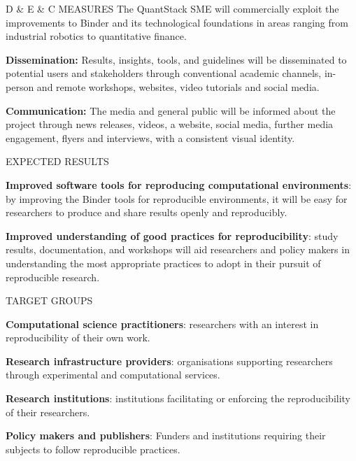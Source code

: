 \begin{multicols}{2}
\begin{summarybox}{D \& E \& C MEASURES}
The QuantStack SME will commercially exploit the improvements to Binder and its technological foundations in areas ranging from
industrial robotics to quantitative finance.

\textbf{Dissemination:} Results, insights, tools, and guidelines will
  be disseminated to potential users and stakeholders through conventional
  academic channels, in-person and remote workshops, websites, video tutorials
  and social media.

\textbf{Communication:} The media and general public will be informed
  about the project through news releases, videos, a website, social media,
  further media engagement, flyers and interviews, with a consistent visual
  identity.
\end{summarybox}

\begin{summarybox}{EXPECTED RESULTS}

\textbf{Improved software tools for reproducing computational environments}:
by improving the Binder tools for reproducible environments,
it will be easy for researchers to produce and share results openly and reproducibly.

\textbf{Improved understanding of good practices for reproducibility}: study results, documentation, and workshops will aid researchers and policy makers in understanding the most appropriate practices to adopt in their pursuit of reproducible research.

\end{summarybox}

\begin{summarybox}{TARGET GROUPS}

\textbf{Computational science practitioners}: researchers with an interest in reproducibility of their own work.

\textbf{Research infrastructure providers}: organisations supporting researchers
through experimental and computational services.

\textbf{Research institutions}: institutions facilitating or enforcing the reproducibility of their researchers.

\textbf{Policy makers and publishers}: Funders and institutions requiring their subjects to follow reproducible practices.
\end{summarybox}


\end{multicols}
